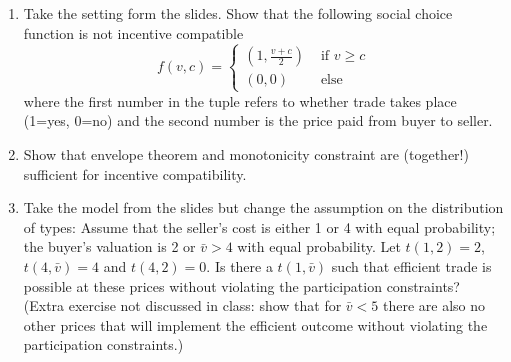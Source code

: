 \documentclass[a4paper,12pt]{article}
\begin{document}
\begin{enumerate}
\item Take the setting form the slides. Show that the following social choice function is not incentive compatible
  $$f(v,c)=
  \begin{cases}
    (1,\frac{v+c}{2})&\text{ if }v\geq c\\
    (0,0) &\text{ else}
  \end{cases}
$$
  where the first number in the tuple refers to whether trade takes place (1=yes, 0=no) and the second number is the price paid from buyer to seller.
\item Show that envelope theorem and monotonicity constraint are (together!) sufficient for incentive compatibility.
\item Take the model from the slides but change the assumption on the distribution of types: Assume that the seller's cost is either 1 or 4 with equal probability; the buyer's valuation is 2 or $\bar v>4$ with equal probability. Let $t(1,2)=2$, $t(4,\bar v)=4$ and $t(4,2)=0$. 
  Is there a $t(1,\bar v)$ such that efficient trade is possible at these prices without violating the participation constraints? \\(Extra exercise not discussed in class: show that for $\bar v<5$ there are also no other prices that will implement the efficient outcome without violating the participation constraints.)
\end{enumerate}
\end{document}
